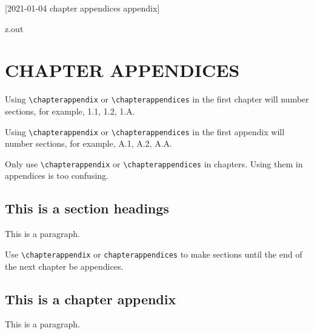 [2021-01-04 chapter appendices appendix]

\begin{VerbatimOut}{z.out}
\chapter{CHAPTER APPENDICES}

Using \verb+\chapterappendix+ or \verb+\chapterappendices+
in the first chapter will number sections, for example,
1.1, 1.2, 1.A.

Using \verb+\chapterappendix+ or \verb+\chapterappendices+
in the first appendix will number sections, for example,
A.1, A.2, A.A.

Only use \verb+\chapterappendix+ or \verb+\chapterappendices+
in chapters.
Using them in appendices is too confusing.

\section{This is a section headings}

This is a paragraph.

Use \verb+\chapterappendix+ or \verb+chapterappendices+
to make sections until the end of the next chapter
be appendices.

\chapterappendix

\section{This is a chapter appendix}

This is a paragraph.
\end{VerbatimOut}

\MyIO
